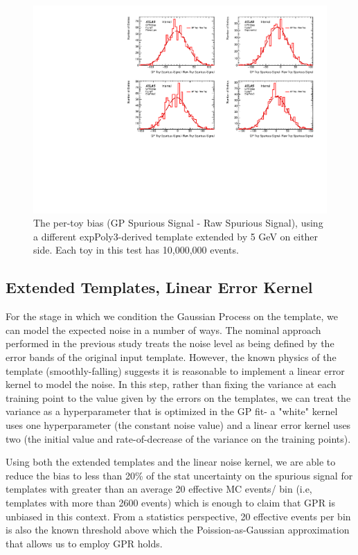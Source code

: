 \begin{figure} 
\begin{center}
  \includegraphics[width=\textwidth]{figures/background/gpr/validation/padded/ToyTest_FitSigBiases_highpT_10M_noSig}   
\caption{The per-toy bias (GP Spurious Signal - Raw Spurious Signal), using a different expPoly3-derived template extended by 5 GeV on either side. Each toy in this test has 10,000,000 events.}
\label{fig:bias_padded_highpt_10M_noSig}
\end{center}
\end{figure}

\subsection{Extended Templates, Linear Error Kernel}

For the stage in which we condition the Gaussian Process on the template, we can model the expected noise in a number of ways. The nominal approach performed in the previous study treats the noise level as being defined by the error bands of the original input template. However, the known physics of the template (smoothly-falling) suggests it is reasonable to implement a linear error kernel to model the noise. In this step, rather than fixing the variance at each training point to the value given by the errors on the templates, we can treat the variance as a hyperparameter that is optimized in the GP fit- a "white" kernel uses one hyperparameter (the constant noise value) and a linear error kernel uses two (the initial value and rate-of-decrease of the variance on the training points).

Using both the extended templates and the linear noise kernel, we are able to reduce the bias to less than 20\% of the stat uncertainty on the spurious signal for templates with greater than an average 20 effective MC events/ bin (i.e, templates with more than 2600 events) which is enough to claim that GPR is unbiased in this context. From a statistics perspective, 20 effective events per bin is also the known threshold above which the Poission-as-Gaussian approximation that allows us to employ GPR holds.

